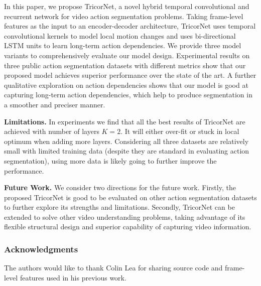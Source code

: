 \documentclass{article}
\begin{document}
In this paper, we propose TricorNet, a novel hybrid temporal convolutional and recurrent network for video action segmentation problems. Taking frame-level features as the input to an encoder-decoder architecture, TricorNet uses temporal convolutional kernels to model local motion changes and uses bi-directional LSTM units to learn long-term action dependencies. We provide three model variants to comprehensively evaluate our model design. Experimental results on three public action segmentation datasets with different metrics show that our proposed model achieves superior performance over the state of the art. A further qualitative exploration on action dependencies shows that our model is good at capturing long-term action dependencies, which help to produce segmentation in a smoother and preciser manner. 

\noindent \textbf{Limitations.} In experiments we find that all the best results of TricorNet are achieved with number of layers $K=2$. It will either over-fit or stuck in local optimum when adding more layers. Considering all three datasets are relatively small with limited training data (despite they are standard in evaluating action segmentation), using more data is likely going to further improve the performance.

\noindent \textbf{Future Work.} We consider two directions for the future work. Firstly, the proposed TricorNet is good to be evaluated on other action segmentation datasets to further explore its strengths and limitations. Secondly, TricorNet can be extended to solve other video understanding problems, taking advantage of its flexible structural design and superior capability of capturing video information.


\subsubsection*{Acknowledgments}
The authors would like to thank Colin Lea for sharing source code and frame-level features used in his previous work.

\small


\end{document}
